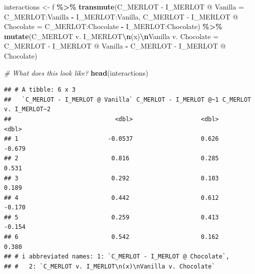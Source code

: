 \documentclass[
]{book}
\newenvironment{Shaded}{\begin{snugshade}}{\end{snugshade}}
\newcommand{\AttributeTok}[1]{\textcolor[rgb]{0.13,0.29,0.53}{#1}}
\newcommand{\CommentTok}[1]{\textcolor[rgb]{0.56,0.35,0.01}{\textit{#1}}}
\newcommand{\FunctionTok}[1]{\textcolor[rgb]{0.13,0.29,0.53}{\textbf{#1}}}
\newcommand{\NormalTok}[1]{#1}
\newcommand{\OtherTok}[1]{\textcolor[rgb]{0.56,0.35,0.01}{#1}}
\newcommand{\SpecialCharTok}[1]{\textcolor[rgb]{0.81,0.36,0.00}{\textbf{#1}}}
\newcommand{\StringTok}[1]{\textcolor[rgb]{0.31,0.60,0.02}{#1}}
\begin{document}
\begin{Shaded}
\begin{Highlighting}[]
\NormalTok{interactions }\OtherTok{\textless{}{-}} 
\NormalTok{  f }\SpecialCharTok{\%\textgreater{}\%}
  \FunctionTok{transmute}\NormalTok{(}\StringTok{\textasciigrave{}}\AttributeTok{C\_MERLOT {-} I\_MERLOT @ Vanilla}\StringTok{\textasciigrave{}} \OtherTok{=} \StringTok{\textasciigrave{}}\AttributeTok{C\_MERLOT:Vanilla}\StringTok{\textasciigrave{}} \SpecialCharTok{{-}} \StringTok{\textasciigrave{}}\AttributeTok{I\_MERLOT:Vanilla}\StringTok{\textasciigrave{}}\NormalTok{,}
            \StringTok{\textasciigrave{}}\AttributeTok{C\_MERLOT {-} I\_MERLOT @ Chocolate}\StringTok{\textasciigrave{}} \OtherTok{=} \StringTok{\textasciigrave{}}\AttributeTok{C\_MERLOT:Chocolate}\StringTok{\textasciigrave{}} \SpecialCharTok{{-}} \StringTok{\textasciigrave{}}\AttributeTok{I\_MERLOT:Chocolate}\StringTok{\textasciigrave{}}\NormalTok{) }\SpecialCharTok{\%\textgreater{}\%}
  \FunctionTok{mutate}\NormalTok{(}\StringTok{\textasciigrave{}}\AttributeTok{C\_MERLOT v. I\_MERLOT}\SpecialCharTok{\textbackslash{}n}\AttributeTok{(x)}\SpecialCharTok{\textbackslash{}n}\AttributeTok{Vanilla v. Chocolate}\StringTok{\textasciigrave{}} \OtherTok{=} \StringTok{\textasciigrave{}}\AttributeTok{C\_MERLOT {-} I\_MERLOT @ Vanilla}\StringTok{\textasciigrave{}} \SpecialCharTok{{-}} \StringTok{\textasciigrave{}}\AttributeTok{C\_MERLOT {-} I\_MERLOT @ Chocolate}\StringTok{\textasciigrave{}}\NormalTok{)}

\CommentTok{\# What does this look like?}
\FunctionTok{head}\NormalTok{(interactions)}
\end{Highlighting}
\end{Shaded}

\begin{verbatim}
## # A tibble: 6 x 3
##   `C_MERLOT - I_MERLOT @ Vanilla` C_MERLOT - I_MERLOT @~1 C_MERLOT v. I_MERLOT~2
##                             <dbl>                   <dbl>                  <dbl>
## 1                         -0.0537                   0.626                 -0.679
## 2                          0.816                    0.285                  0.531
## 3                          0.292                    0.103                  0.189
## 4                          0.442                    0.612                 -0.170
## 5                          0.259                    0.413                 -0.154
## 6                          0.542                    0.162                  0.380
## # i abbreviated names: 1: `C_MERLOT - I_MERLOT @ Chocolate`,
## #   2: `C_MERLOT v. I_MERLOT\n(x)\nVanilla v. Chocolate`
\end{verbatim}
\end{document}

